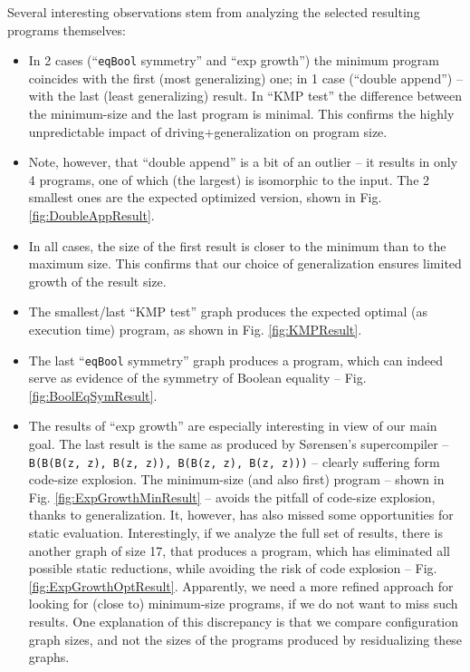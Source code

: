 \documentclass[submission,copyright,creativecommons]{eptcs}
\begin{document}
Several interesting observations stem from analyzing the selected resulting programs themselves:
\begin{itemize}
  \item In 2 cases (``\verb|eqBool| symmetry'' and ``exp growth'') the minimum program coincides with the first (most generalizing) one;
    in 1 case (``double append'') -- with the last (least generalizing) result. 
    In ``KMP test'' the difference between the minimum-size and the last program is minimal.
    This confirms the highly unpredictable impact of driving+generalization on program size.
  \item Note, however, that ``double append'' is a bit of an outlier -- it results in only 4 programs,
    one of which (the largest) is isomorphic to the input. The 2 smallest ones are the expected
    optimized version, shown in Fig. \ref{fig:DoubleAppResult}.
  \item In all cases, the size of the first result is closer to the minimum than to the maximum size.
    This confirms that our choice of generalization ensures limited growth of the result size.
  \item The smallest/last ``KMP test'' graph produces the expected optimal (as execution time) program,
    as shown in Fig. \ref{fig:KMPResult}.
  \item The last ``\verb|eqBool| symmetry'' graph produces a program, which can indeed serve as evidence of the
    symmetry of Boolean equality -- Fig. \ref{fig:BoolEqSymResult}.
  \item The results of ``exp growth'' are especially interesting in view of our main goal.
    The last result is the same as produced by S{\o}rensen's supercompiler --
    \verb|B(B(B(z, z), B(z, z)), B(B(z, z), B(z, z)))| -- clearly suffering form code-size explosion.
    The minimum-size (and also first) program -- shown in Fig. \ref{fig:ExpGrowthMinResult} --
    avoids the pitfall of code-size explosion, thanks to generalization.
    It, however, has also missed some opportunities for static evaluation.
    Interestingly, if we analyze the full set of results, there is another
    graph of size 17, that produces a program, which has eliminated all possible static reductions,
    while avoiding the risk of code explosion -- Fig. \ref{fig:ExpGrowthOptResult}.
    Apparently, we need a more refined approach for looking for (close to) minimum-size programs, 
    if we do not want to miss such results.
    One explanation of this discrepancy is that we compare configuration graph sizes, and not
    the sizes of the programs produced by residualizing these graphs.

\end{itemize}
\end{document}
